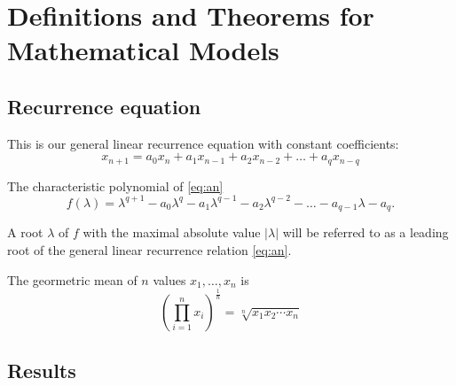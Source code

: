 \section{Definitions and Theorems for Mathematical Models}
\label{ch:theorems}

\subsection{Recurrence equation}

This is our general linear recurrence equation with constant coefficients:
\begin{equation}\label{eq:an}
    x_{n+1} = a_0x_n + a_1x_{n-1} + a_2x_{n-2} + \dots + a_{q}x_{n-q}
\end{equation}

The characteristic polynomial of \eqref{eq:an}
\begin{equation}\label{eq:fchar}
    f(\lambda) = \lambda^{q+1} - a_0\lambda^q - a_1\lambda^{q-1} - a_2\lambda^{q-2} - \dots - a_{q-1}\lambda - a_q.
\end{equation}

\begin{definition}
A root $\lambda$ of $f$ with the maximal absolute value $|\lambda|$ will be referred to as a leading root of the general linear recurrence relation \eqref{eq:an}.
\end{definition}

\begin{definition}
The geormetric mean of $n$ values $x_1,\dots,x_n$ is
\begin{equation}\label{eq:geometricmean}
   \left(\prod\limits_{i=1}^n x_i \right)^{\frac1n} = \sqrt[n]{x_1 x_2 \cdots x_n}
\end{equation}
\end{definition}

\subsection{Results}

